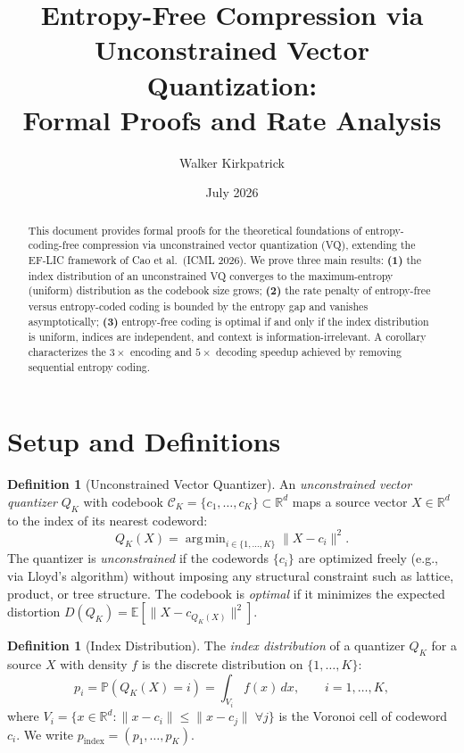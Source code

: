 \documentclass[11pt,a4paper]{article}
\title{Entropy-Free Compression via Unconstrained Vector Quantization:\\
\large Formal Proofs and Rate Analysis}
\author{Walker Kirkpatrick}
\date{July 2026}
\theoremstyle{definition}
\newtheorem{definition}[theorem]{Definition}
\theoremstyle{remark}
\newcommand{\R}{\mathbb{R}}
\newcommand{\E}{\mathbb{E}}
\newcommand{\PP}{\mathbb{P}}
\DeclareMathOperator*{\argmin}{arg\,min}
\begin{document}
\maketitle

\begin{abstract}
This document provides formal proofs for the theoretical foundations of
entropy-coding-free compression via unconstrained vector quantization (VQ),
extending the EF-LIC framework of Cao et al.\ (ICML 2026).
We prove three main results:
\textbf{(1)} the index distribution of an unconstrained VQ converges to the
maximum-entropy (uniform) distribution as the codebook size grows;
\textbf{(2)} the rate penalty of entropy-free versus entropy-coded coding
is bounded by the entropy gap and vanishes asymptotically;
\textbf{(3)} entropy-free coding is optimal if and only if the index
distribution is uniform, indices are independent, and context is
information-irrelevant.
A corollary characterizes the $3\times$ encoding and $5\times$ decoding
speedup achieved by removing sequential entropy coding.
\end{abstract}

\tableofcontents
\bigskip

\section{Setup and Definitions}

\begin{definition}[Unconstrained Vector Quantizer]
\label{def:unconstrained-vq}
An \emph{unconstrained vector quantizer} $Q_K$ with codebook
$\mathcal{C}_K = \{c_1, \ldots, c_K\} \subset \R^d$ maps a source vector
$X \in \R^d$ to the index of its nearest codeword:
\[
Q_K(X) = \argmin_{i \in \{1,\ldots,K\}} \|X - c_i\|^2.
\]
The quantizer is \emph{unconstrained} if the codewords $\{c_i\}$ are
optimized freely (e.g., via Lloyd's algorithm) without imposing any
structural constraint such as lattice, product, or tree structure.
The codebook is \emph{optimal} if it minimizes the expected distortion
$D(Q_K) = \E[\|X - c_{Q_K(X)}\|^2]$.
\end{definition}

\begin{definition}[Index Distribution]
\label{def:index-distribution}
The \emph{index distribution} of a quantizer $Q_K$ for a source $X$
with density $f$ is the discrete distribution on $\{1,\ldots,K\}$:
\[
p_i = \PP(Q_K(X) = i) = \int_{V_i} f(x)\,dx, \qquad i = 1, \ldots, K,
\]
where $V_i = \{x \in \R^d : \|x - c_i\| \le \|x - c_j\| \;\forall j\}$
is the Voronoi cell of codeword $c_i$.
We write $p_{\mathrm{index}} = (p_1, \ldots, p_K)$.
\end{definition}
\end{document}

